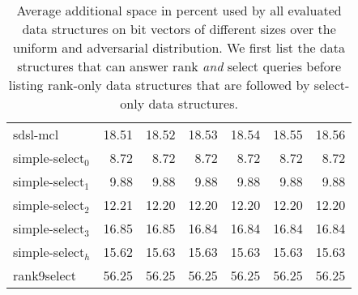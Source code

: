 \documentclass[a4paper,UKenglish,cleveref, autoref, thm-restate]{lipics-v2021}
\begin{document}
\begin{table}
\begin{tabular}{lrrrrrr}
    sdsl-mcl & 18.51 & 18.52 & 18.53 & 18.54 & 18.55 & 18.56 \\
    simple-select\(_0\) &  8.72 &  8.72 &  8.72 &  8.72 &  8.72 &  8.72 \\
    simple-select\(_1\) &  9.88 &  9.88 &  9.88 &  9.88 &  9.88 &  9.88 \\
    simple-select\(_2\) & 12.21 & 12.20 & 12.20 & 12.20 & 12.20 & 12.20 \\
    simple-select\(_3\) & 16.85 & 16.85 & 16.84 & 16.84 & 16.84 & 16.84 \\
    simple-select\(_h\) & 15.62 & 15.63 & 15.63 & 15.63 & 15.63 & 15.63 \\
    rank9select & 56.25 & 56.25 & 56.25 & 56.25 & 56.25 & 56.25 \\
    \bottomrule
  \end{tabular}
  \caption{Average additional space in percent used by all evaluated data structures on bit vectors of different sizes over the uniform and adversarial distribution.
    We first list the data structures that can answer rank \emph{and} select queries before listing rank-only data structures that are followed by select-only data structures.}
  \label{tab:space_requirements}
\end{table}
\end{document}
